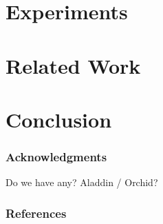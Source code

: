 \documentclass{article}
\begin{document}
\section{Experiments}




\section{Related Work}




\section{Conclusion}



\subsubsection*{Acknowledgments}
Do we have any? Aladdin / Orchid?


\subsubsection*{References}
\renewcommand{\refname}{\vskip -0.75cm}  %

\small{

}
\end{document}
